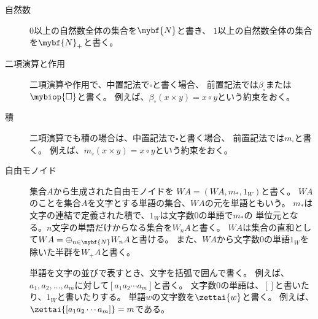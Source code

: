 \begin{description} %
	\item[自然数]$0$以上の自然数全体の集合を$\mybf{N}$と書き、
	$1$以上の自然数全体の集合を$\mybf{N}_+$と書く。
	\item[二項演算と作用]二項演算や作用で、中置記法で$\square$と書く場合、
	前置記法では$\beta_\square$または$\mybiop{\square}$と書く。
	例えば、$\beta_\circ(x\times y)=x\circ y$という約束をおく。
	\item[積]二項演算でも積の場合は、中置記法で$\square$と書く場合、
	前置記法では$m_\square$と書く。
	例えば、$m_\circ(x\times y)=x\circ y$という約束をおく。
	\item[自由モノイド]集合$A$から生成された自由モノイドを
	$WA=(WA,m_*,1_W)$と書く。
	$WA$のことを集合$A$を文字とする単語の集合、$WA$の元を単語ともいう。
	$m_*$は文字の連結で定義された積で、$1_W$は文字数$0$の単語で$m_*$の
	単位元となる。$n$文字の単語だけからなる集合を$W_nA$と書く。
	$WA$は集合の直和として$WA = \oplus_{n\in\mybf{N}}W_nA$と書ける。
	また、$WA$から文字数$0$の単語$1_W$を除いた半群を$W_+A$と書く。

	単語を文字の並びで表すとき、文字を括弧で囲んで書く。
	例えば、$a_1,a_2,\dots,a_m$に対して$[a_1a_2\cdots a_m]$と書く。
	文字数$0$の単語は、$[]$と書いたり、$1_W$と書いたりする。
	単語$w$の文字数を$\zettai{w}$と書く。
	例えば、$\zettai{[a_1a_2\cdots a_m]}=m$である。


\end{description}
